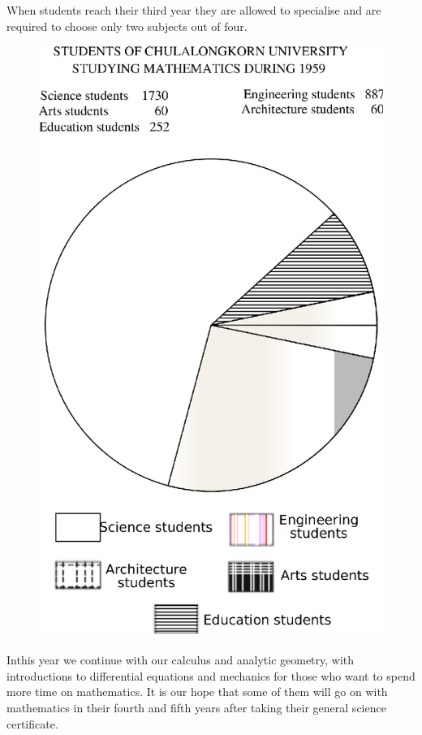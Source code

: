 When students reach their third year they are allowed to specialise and are required to choose only two subjects out of four. 
\begin{figure}[H]
\centering
\includegraphics{figures/fig_04.eps}
\end{figure} 

\setcounter{pageoriginal}{156}
\indent
In\pageoriginale this year we continue with our calculus and analytic geometry, with introductions to differential equations and mechanics for those who want to spend more time on mathematics. It is our hope that some of them will go on with mathematics in their fourth and fifth years after taking their general science certificate.

